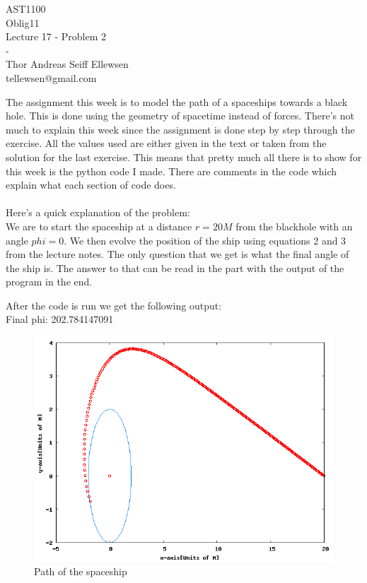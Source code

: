 \documentclass[12pt,norsk,a4paper]{article}
\begin{document}
\begin{titlepage}
\begin{center}
AST1100\\
Oblig11\\
Lecture 17 - Problem 2\\
-\\
Thor Andreas Seiff Ellewsen\\
tellewsen@gmail.com\\
\end{center}
The assignment this week is to model the path of a spaceships towards a black hole. This is done using the geometry of spacetime instead of forces. There's not much to explain this week since the assignment is done step by step through the exercise. All the values used are either given in the text or taken from the solution for the last exercise. This means that pretty much all there is to show for this week is the python code I made. There are comments in the code which explain what each section of code does.\\
\\
Here's a quick explanation of the problem:\\
We are to start the spaceship at a distance $r=20M$ from the blackhole with an angle $phi = 0$.
We then evolve the position of the ship using equations 2 and 3 from the lecture notes.
The only question that we get is what the final angle of the ship is.
The answer to that can be read in the part with the output of the program in the end.
\end{titlepage}


After the code is run we get the following output:\\
Final phi:  202.784147091\\

\begin{figure}[h]
\includegraphics[width=\textwidth]{oblig11.png}
\caption{Path of the spaceship}
\end{figure}
\end{document}
